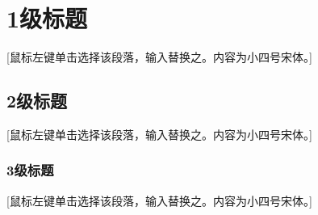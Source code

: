 \chapter{1级标题}
\label{chapter3}

[鼠标左键单击选择该段落，输入替换之。内容为小四号宋体。]

\section{2级标题}
 [鼠标左键单击选择该段落，输入替换之。内容为小四号宋体。]

\subsection{3级标题}
[鼠标左键单击选择该段落，输入替换之。内容为小四号宋体。]